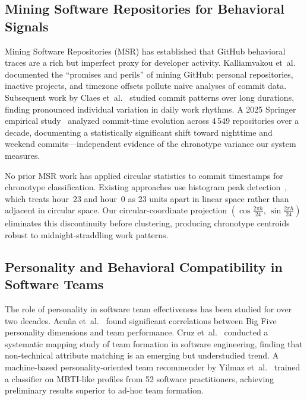 \documentclass[conference]{IEEEtran}
\begin{document}
\subsection{Mining Software Repositories for Behavioral Signals}

Mining Software Repositories (MSR) has established that GitHub
behavioral traces are a rich but imperfect proxy for developer activity.
Kalliamvakou et~al.~\cite{kalliamvakou2016indepth} documented the
``promises and perils'' of mining GitHub: personal repositories,
inactive projects, and timezone offsets pollute naive analyses of commit
data.
Subsequent work by Claes et~al.~\cite{claes2018developers} studied
commit patterns over long durations, finding pronounced individual
variation in daily work rhythms.
A 2025 Springer empirical study~\cite{talos2025tgif} analyzed
commit-time evolution across 4\,549 repositories over a decade,
documenting a statistically significant shift toward nighttime and
weekend commits—independent evidence of the chronotype variance our
system measures.

No prior MSR work has applied circular statistics to commit timestamps
for chronotype classification.
Existing approaches use histogram peak detection~\cite{claes2018developers},
which treats hour~23 and hour~0 as 23 units apart in linear space
rather than adjacent in circular space.
Our circular-coordinate projection $(\cos\!\frac{2\pi h}{24},\,
\sin\!\frac{2\pi h}{24})$ eliminates this discontinuity before
clustering, producing chronotype centroids robust to
midnight-straddling work patterns.

\subsection{Personality and Behavioral Compatibility in Software Teams}

The role of personality in software team effectiveness has been studied
for over two decades.
Acu\~{n}a et~al.~\cite{acuna2009personality} found significant
correlations between Big Five personality dimensions and team
performance.
Cruz et~al.~\cite{cruz2015forty} conducted a systematic mapping study
of team formation in software engineering, finding that non-technical
attribute matching is an emerging but understudied trend.
A machine-based personality-oriented team recommender by Yilmaz
et~al.~\cite{yilmaz2015machine} trained a classifier on MBTI-like
profiles from 52 software practitioners, achieving preliminary results
superior to ad-hoc team formation.
\end{document}
